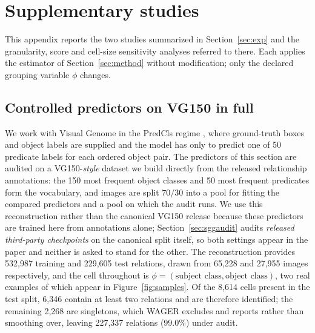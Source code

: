 \section{Supplementary studies}\label{app:studies}

This appendix reports the two studies summarized in Section~\ref{sec:exp} and the
granularity, score and cell-size sensitivity analyses referred to there. Each applies the
estimator of Section~\ref{sec:method} without modification; only the declared grouping
variable $\phi$ changes.

\subsection{Controlled predictors on VG150 in full}\label{app:vgmain-full}

We work with Visual Genome \cite{krishna2017visual} in the PredCls regime
\cite{xu2017scene}, where ground-truth boxes and object labels are supplied and
the model has only to predict one of 50 predicate labels for each ordered object pair.
The predictors of this section are audited on a VG150-\emph{style} dataset we build
directly from the released relationship annotations: the 150 most frequent object
classes and 50 most frequent predicates form the vocabulary, and images are split
$70/30$ into a pool for fitting the compared predictors and a pool on which the audit
runs. We use this reconstruction rather than the canonical VG150 release because these
predictors are trained here from annotations alone; Section~\ref{sec:sggaudit} audits
\emph{released third-party checkpoints} on the canonical split itself, so both settings
appear in the paper and neither is asked to stand for the other. The reconstruction
provides 532,987 training and 229,605 test relations, drawn from 65,228 and 27,955
images respectively, and the cell throughout is
$\phi=(\text{subject class},\text{object class})$, two real examples of which appear in
Figure~\ref{fig:samples}. Of the 8,614 cells present in the test split, 6,346 contain at
least two relations and are therefore identified; the remaining 2,268 are singletons,
which WAGER excludes and reports rather than smoothing over, leaving 227,337 relations
(99.0\%) under audit.

